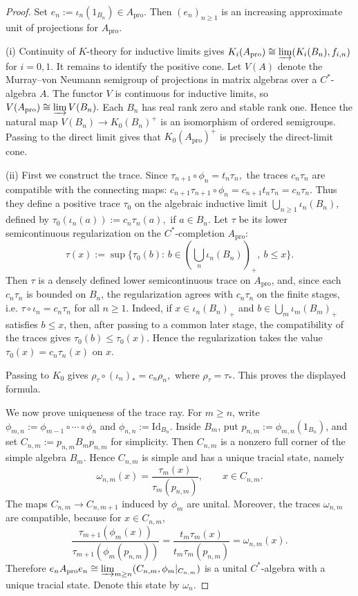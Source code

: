 \documentclass[11pt]{amsart}
\theoremstyle{definition}
\theoremstyle{remark}
\newcommand{\id}{\mathrm{Id}}
\newcommand{\ex}{\mathrm{pro}}
\begin{document}
\begin{proof}
Set $e_n:=\iota_n(1_{B_n})\in A_{\ex}.$ Then $(e_n)_{n\geq1}$ is an increasing approximate unit of projections
for $A_{\ex}$.
\smallskip

\noindent
\textup{(i)}
Continuity of $K$-theory for inductive limits gives $K_i(A_{\ex})\cong \varinjlim(K_i(B_n),f_{i,n})$ for 
$i=0,1.$ It remains to identify the positive cone. Let $V(A)$ denote the
Murray--von Neumann semigroup of projections in matrix algebras over a
$C^*$-algebra $A$. The functor $V$ is continuous for inductive limits, so $V(A_{\ex})\cong\varinjlim V(B_n).$
Each $B_n$ has real rank zero and stable rank one. Hence the natural map $V(B_n)\longrightarrow K_0(B_n)^+$
is an isomorphism of ordered semigroups. Passing to the direct limit gives that
$K_0(A_{\ex})^+$ is precisely the direct-limit cone.

\smallskip

\noindent
\textup{(ii)}
First we construct the trace. Since $\tau_{n+1}\circ\phi_n=t_n\tau_n,$ the traces $c_n\tau_n$
are compatible with the connecting maps: $c_{n+1}\tau_{n+1}\circ\phi_n
=c_{n+1}t_n\tau_n
=c_n\tau_n.$
Thus they define a positive trace $\tau_0$ on the algebraic inductive limit $\bigcup_{n\geq1}\iota_n(B_n),$ defined by
$\tau_0(\iota_n(a)):=c_n\tau_n(a),$ if
$a\in B_n.$
Let $\tau$ be its lower semicontinuous regularization on the $C^*$-completion
$A_{\ex}$:
\[
\tau(x):=\sup\{\tau_0(b):\, b\in (\bigcup_n \iota_n(B_n))_+, \ b\le x\}.
\]
Then $\tau$ is a densely defined lower semicontinuous trace on $A_{\ex}$,
and, since each $c_n\tau_n$ is bounded on $B_n$, the regularization agrees
with $c_n\tau_n$ on the finite stages, i.e.  $\tau\circ\iota_n=c_n\tau_n$ for all
$n\geq1$.
Indeed, if $x\in \iota_n(B_n)_+$ and $b\in\bigcup_m\iota_m(B_m)_+$ satisfies
$b\leq x$, then, after passing to a common later stage, the compatibility of
the traces gives $\tau_0(b)\leq \tau_0(x)$. Hence the regularization takes the
value $\tau_0(x)=c_n\tau_n(x)$ on $x$.

Passing to $K_0$ gives $\rho_\tau\circ(\iota_n)_*=c_n\rho_n,$
where $\rho_\tau=\tau_*$. This proves the displayed formula.

We now prove uniqueness of the trace ray. For $m\geq n$, write $\phi_{m,n}:=\phi_{m-1}\circ\cdots\circ\phi_n$ and
$\phi_{n,n}:=\id_{B_n}.$ Inside \(B_m\), put $p_{n,m}:=\phi_{m,n}(1_{B_n})$, and set $C_{n,m}:=p_{n,m}B_m p_{n,m}$ for simplicity.
Then $C_{n,m}$ is a nonzero full corner of the simple algebra $B_m$. Hence
$C_{n,m}$ is simple and has a unique tracial state, namely
\[
\omega_{n,m}(x)
=
\frac{\tau_m(x)}{\tau_m(p_{n,m})},
\qquad x\in C_{n,m}.
\]
The maps $C_{n,m}\longrightarrow C_{n,m+1}$
induced by $\phi_m$ are unital. Moreover, the traces $\omega_{n,m}$ are
compatible, because for $x\in C_{n,m}$,
\[
\frac{\tau_{m+1}(\phi_m(x))}
     {\tau_{m+1}(\phi_m(p_{n,m}))}
=
\frac{t_m\tau_m(x)}
     {t_m\tau_m(p_{n,m})}
=
\omega_{n,m}(x).
\]
Therefore $e_nA_{\ex}e_n
\cong
\varinjlim_{m\geq n}(C_{n,m},\phi_m|_{C_{n,m}})$
is a unital $C^*$-algebra with a unique tracial state. Denote this state by $\omega_n.$


\end{proof}
\end{document}
